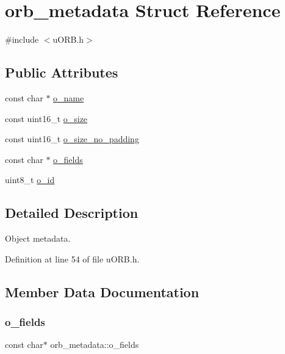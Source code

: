 \hypertarget{structorb__metadata}{}\section{orb\+\_\+metadata Struct Reference}
\label{structorb__metadata}


{\ttfamily \#include $<$u\+O\+R\+B.\+h$>$}

\subsection*{Public Attributes}
\begin{DoxyCompactItemize}
\item 
const char $\ast$ \hyperlink{structorb__metadata_a54d1751f24aa0c1f24934c6712811e58}{o\+\_\+name}
\item 
const uint16\+\_\+t \hyperlink{structorb__metadata_a400a86fe707613e881b620cde7888b74}{o\+\_\+size}
\item 
const uint16\+\_\+t \hyperlink{structorb__metadata_a5a3abec9c79b3b46e97bf0c4cf9c68dd}{o\+\_\+size\+\_\+no\+\_\+padding}
\item 
const char $\ast$ \hyperlink{structorb__metadata_a0eca59345d0097080daec156bb7a9c1f}{o\+\_\+fields}
\item 
uint8\+\_\+t \hyperlink{structorb__metadata_a9f5cae5c486a015774b7accc62ca040e}{o\+\_\+id}
\end{DoxyCompactItemize}


\subsection{Detailed Description}
Object metadata. 

Definition at line 54 of file u\+O\+R\+B.\+h.



\subsection{Member Data Documentation}
\mbox{\label{structorb__metadata_a0eca59345d0097080daec156bb7a9c1f}} 
\subsubsection{\texorpdfstring{o\+\_\+fields}{o\_fields}}
{\footnotesize\ttfamily const char$\ast$ orb\+\_\+metadata\+::o\+\_\+fields}

